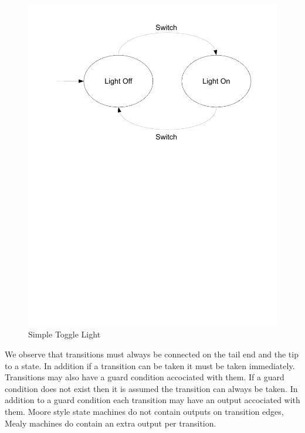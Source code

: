 \begin{figure}[htp]
    \centering
    \includegraphics[trim= 10mm 150mm 10mm 10mm, clip ,width=\imgmedium]{./images/state_blink_light.pdf} %
    \caption{Simple Toggle Light}
    \label{fig:state_blink_light}
\end{figure}

We observe that transitions must always be connected on the tail end and the tip to a state. In addition if a transition can be taken it must be taken immediately. Transitions may also have a guard condition accociated with them. If a guard condition does not exist then it is assumed the transition can always be taken. In addition to a guard condition each transition may have an output accociated with them. Moore style state machines do not contain outputs on transition edges, Mealy machines do contain an extra output per transition.

